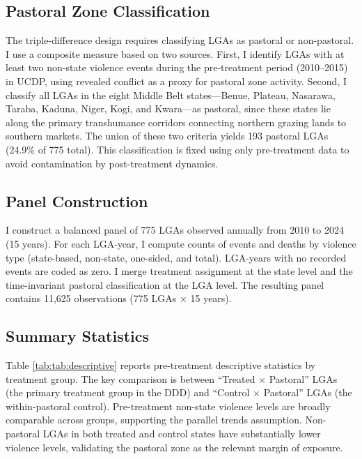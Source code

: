 \documentclass[12pt]{article}
\begin{document}
\subsection{Pastoral Zone Classification}

The triple-difference design requires classifying LGAs as pastoral or non-pastoral. I use a composite measure based on two sources. First, I identify LGAs with at least two non-state violence events during the pre-treatment period (2010--2015) in UCDP, using revealed conflict as a proxy for pastoral zone activity. Second, I classify all LGAs in the eight Middle Belt states---Benue, Plateau, Nasarawa, Taraba, Kaduna, Niger, Kogi, and Kwara---as pastoral, since these states lie along the primary transhumance corridors connecting northern grazing lands to southern markets. The union of these two criteria yields 193 pastoral LGAs (24.9\% of 775 total). This classification is fixed using only pre-treatment data to avoid contamination by post-treatment dynamics.

\subsection{Panel Construction}

I construct a balanced panel of 775 LGAs observed annually from 2010 to 2024 (15 years). For each LGA-year, I compute counts of events and deaths by violence type (state-based, non-state, one-sided, and total). LGA-years with no recorded events are coded as zero. I merge treatment assignment at the state level and the time-invariant pastoral classification at the LGA level. The resulting panel contains 11,625 observations (775 LGAs $\times$ 15 years).

\subsection{Summary Statistics}

Table \ref{tab:tab:descriptive} reports pre-treatment descriptive statistics by treatment group. The key comparison is between ``Treated $\times$ Pastoral'' LGAs (the primary treatment group in the DDD) and ``Control $\times$ Pastoral'' LGAs (the within-pastoral control). Pre-treatment non-state violence levels are broadly comparable across groups, supporting the parallel trends assumption. Non-pastoral LGAs in both treated and control states have substantially lower violence levels, validating the pastoral zone as the relevant margin of exposure.
\end{document}
